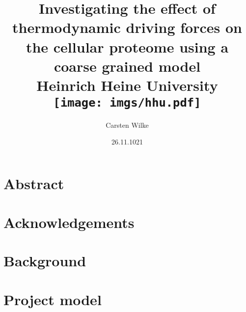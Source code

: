 \documentclass{report}
\title{
{Investigating the effect of thermodynamic driving forces on the cellular proteome using a coarse grained model}\\
{\large Heinrich Heine University}\\
{\texttt{[image: imgs/hhu.pdf]}}
}
\author{Carsten Wilke}
\date{26.11.1021}
\begin{document}
\maketitle

\chapter*{Abstract}


\chapter*{Acknowledgements}


\tableofcontents

\chapter{Background}


\chapter{Project model}




\end{document}
